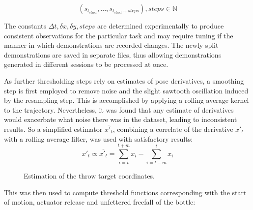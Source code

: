 \documentclass{article}
\begin{document}
\begin{equation}
	(s_{t_{start}}, ... , s_{t_{start}+steps}), steps \in \mathbb{N}
\end{equation}
	
The constants $\Delta t, \delta x, \delta y, steps$ are determined experimentally to produce consistent observations for the particular task and may require tuning if the manner in which demonstrations are recorded changes. The newly split demonstrations are saved in separate files, thus allowing demonstrations generated in different sessions to be processed at once.

As further thresholding steps rely on estimates of pose derivatives, a smoothing step is first employed to remove noise and the slight sawtooth oscillation induced by the resampling step. This is accomplished by applying a rolling average kernel to the trajectory. Nevertheless, it was found that any estimate of derivatives would exacerbate what noise there was in the dataset, leading to inconsistent results. So a simplified estimator $\overline{x'_t}$, combining a correlate of the derivative $x'_t$ with a rolling average filter, was used with satisfactory results:
\begin{equation}
    x'_t \propto \overline{x'_t} = \sum_{i=t}^{t+m}  x_i - \sum_{i=t-m}^{t}  x_i
\end{equation}


\begin{figure}
	\centering
	\caption{Estimation of the throw target coordinates.}
	\label{fig:fig3}
\end{figure}


This was then used to compute threshold functions corresponding with the start of motion, actuator release and unfettered freefall of the bottle:
\end{document}
